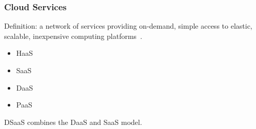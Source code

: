 \begin{frame}[fragile]
    \frametitle{Cloud Services}
        \normalsize
        Definition: a network of services providing on-demand, simple access to elastic, scalable, inexpensive computing platforms~\cite{wang2008scientific}.

    \begin{itemize}
    	\item HaaS
        \item SaaS
    	\item DaaS
        \item PaaS
    \end{itemize}


    DSaaS combines the DaaS and SaaS model.



\end{frame}